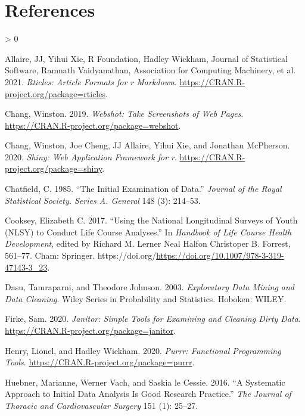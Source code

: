 \documentclass{article}
\newlength{\cslhangindent}
\newenvironment{CSLReferences}[2] %
 {%
  \setlength{\parindent}{0pt}
  \ifodd #1 \everypar{\setlength{\hangindent}{\cslhangindent}}\ignorespaces\fi
  \ifnum #2 > 0
  \setlength{\parskip}{#2\baselineskip}
  \fi
 }%
 {}
\begin{document}
\hypertarget{references}{%
\section*{References}\label{references}}

\hypertarget{refs}{}
\begin{CSLReferences}{1}{0}
\leavevmode\hypertarget{ref-rticles}{}%
Allaire, JJ, Yihui Xie, R Foundation, Hadley Wickham, Journal of Statistical Software, Ramnath Vaidyanathan, Association for Computing Machinery, et al. 2021. \emph{Rticles: Article Formats for r Markdown}. \url{https://CRAN.R-project.org/package=rticles}.

\leavevmode\hypertarget{ref-webshot}{}%
Chang, Winston. 2019. \emph{Webshot: Take Screenshots of Web Pages}. \url{https://CRAN.R-project.org/package=webshot}.

\leavevmode\hypertarget{ref-shiny}{}%
Chang, Winston, Joe Cheng, JJ Allaire, Yihui Xie, and Jonathan McPherson. 2020. \emph{Shiny: Web Application Framework for r}. \url{https://CRAN.R-project.org/package=shiny}.

\leavevmode\hypertarget{ref-Chatfield1985TIEo}{}%
Chatfield, C. 1985. {``The Initial Examination of Data.''} \emph{Journal of the Royal Statistical Society. Series A. General} 148 (3): 214--53.

\leavevmode\hypertarget{ref-eliznlsy}{}%
Cooksey, Elizabeth C. 2017. {``Using the National Longitudinal Surveys of Youth (NLSY) to Conduct Life Course Analyses.''} In \emph{Handbook of Life Course Health Development}, edited by Richard M. Lerner Neal Halfon Christoper B. Forrest, 561--77. Cham: Springer. https://doi.org/\url{https://doi.org/10.1007/978-3-319-47143-3_23}.

\leavevmode\hypertarget{ref-DasuTamraparni2003Edma}{}%
Dasu, Tamraparni, and Theodore Johnson. 2003. \emph{Exploratory Data Mining and Data Cleaning}. Wiley Series in Probability and Statistics. Hoboken: WILEY.

\leavevmode\hypertarget{ref-janitor}{}%
Firke, Sam. 2020. \emph{Janitor: Simple Tools for Examining and Cleaning Dirty Data}. \url{https://CRAN.R-project.org/package=janitor}.

\leavevmode\hypertarget{ref-purrr}{}%
Henry, Lionel, and Hadley Wickham. 2020. \emph{Purrr: Functional Programming Tools}. \url{https://CRAN.R-project.org/package=purrr}.

\leavevmode\hypertarget{ref-HuebnerMariannePhD2016Asat}{}%
Huebner, Marianne, Werner Vach, and Saskia le Cessie. 2016. {``A Systematic Approach to Initial Data Analysis Is Good Research Practice.''} \emph{The Journal of Thoracic and Cardiovascular Surgery} 151 (1): 25--27.


\end{CSLReferences}
\end{document}
